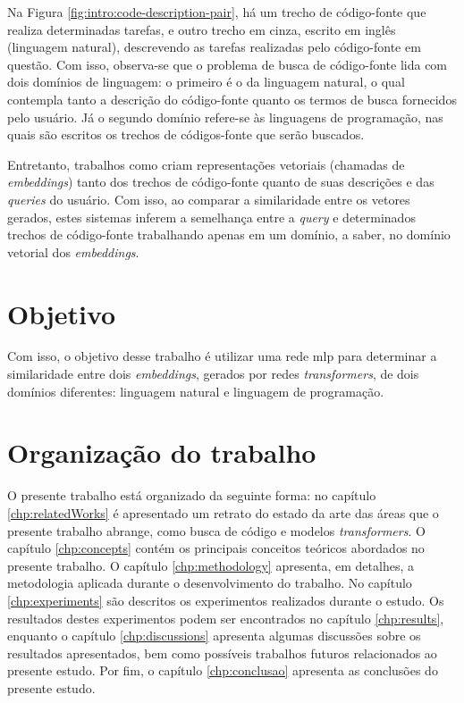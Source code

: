 Na Figura \ref{fig:intro:code-description-pair}, há um trecho de código-fonte que realiza determinadas tarefas, e outro trecho em cinza, escrito em inglês (linguagem natural), descrevendo as tarefas realizadas pelo código-fonte em questão. Com isso, observa-se que o problema de busca de código-fonte lida com dois domínios de linguagem: o primeiro é o da linguagem natural, o qual contempla tanto a descrição do código-fonte quanto os termos de busca fornecidos pelo usuário. Já o segundo domínio refere-se às linguagens de programação, nas quais são escritos os trechos de códigos-fonte que serão buscados.

Entretanto, trabalhos como \textcite{Gu2018DeepCS} criam representações vetoriais (chamadas de \textit{embeddings}) tanto dos trechos de código-fonte quanto de suas descrições e das \textit{queries} do usuário. Com isso, ao comparar a similaridade entre os vetores gerados, estes sistemas inferem a semelhança entre a \textit{query} e determinados trechos de código-fonte trabalhando apenas em um domínio, a saber, no domínio vetorial dos \textit{embeddings}.

\section{Objetivo}
Com isso, o objetivo desse trabalho é utilizar uma rede \gls{mlp} para determinar a similaridade entre dois \textit{embeddings}, gerados por redes \textit{transformers}, de dois domínios diferentes: linguagem natural e linguagem de programação.

\section{Organização do trabalho}
O presente trabalho está organizado da seguinte forma: no capítulo \ref{chp:relatedWorks} é apresentado um retrato do estado da arte das áreas que o presente trabalho abrange, como busca de código e modelos \textit{transformers}. O capítulo \ref{chp:concepts} contém os principais conceitos teóricos abordados no presente trabalho. O capítulo \ref{chp:methodology} apresenta, em detalhes, a metodologia aplicada durante o desenvolvimento do trabalho. No capítulo \ref{chp:experiments} são descritos os experimentos realizados durante o estudo. Os resultados destes experimentos podem ser encontrados no capítulo \ref{chp:results}, enquanto o capítulo \ref{chp:discussions} apresenta algumas discussões sobre os resultados apresentados, bem como possíveis trabalhos futuros relacionados ao presente estudo. Por fim, o capítulo \ref{chp:conclusao} apresenta as conclusões do presente estudo.
